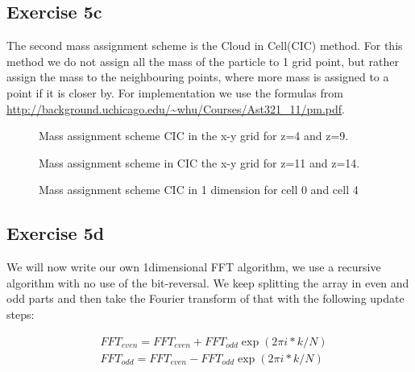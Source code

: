 \subsection{Exercise 5c}
The second mass assignment scheme is the Cloud in Cell(CIC) method. For this method we do not assign all the mass of the particle to 1 grid point, but rather assign the mass to the neighbouring points, where more mass is assigned to a point if it is closer by. For implementation we use the formulas from \url{http://background.uchicago.edu/~whu/Courses/Ast321_11/pm.pdf}. 

 \begin{figure}
    \centering
    \qquad
    \caption{Mass assignment scheme CIC in the x-y grid for z=4 and z=9.}

  \end{figure}
 \begin{figure}
    \centering
    \qquad
    \caption{Mass assignment scheme in CIC the x-y grid for z=11 and z=14.}
  \end{figure}

 \begin{figure}
    \centering
    \qquad
    \caption{Mass assignment scheme CIC in 1 dimension for cell 0 and cell 4}
  \end{figure}
  
\subsection{Exercise 5d}
We will now write our own 1dimensional FFT algorithm, we use a recursive algorithm with no use of the bit-reversal. We keep splitting the array in even and odd parts and then take the Fourier transform of that with the following update steps:

    
\begin{equation}
\begin{split}
&FFT_{even}=FFT_{even}+FFT_{odd}\exp(2\pi i*k/N) \\
&FFT_{odd}=FFT_{even}-FFT_{odd}\exp(2\pi i*k/N) 
\end{split}
\end{equation}


